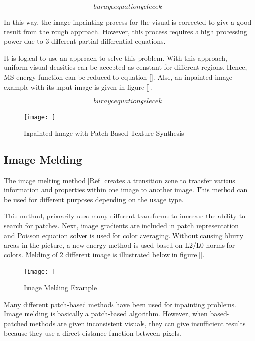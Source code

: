 \begin{equation}
    buraya equation gelecek
\end{equation}

In this way, the image inpainting process for the visual is corrected to give a good result from the rough approach. However, this process requires a high processing power due to 3 different partial differential equations.

It is logical to use an approach to solve this problem. With this approach, uniform visual densities can be accepted as constant for different regions. Hence, MS energy function can be reduced to equation []. Also, an inpainted image example with its input image is given in figure [].

\begin{equation}
    buraya equation gelecek
\end{equation}

\begin{figure}[h]
    \centering
    \texttt{[image: ]}
    \caption{Inpainted Image with Patch Based Texture Synthesis}
    \label{fig:my_label}
\end{figure}

\subsection{Image Melding}

The image melting method [Ref] creates a transition zone to transfer various information and properties within one image to another image. This method can be used for different purposes depending on the usage type.

This method, primarily uses many different transforms to increase the ability to search for patches. Next, image gradients are included in patch representation and Poisson equation solver is used for color averaging. Without causing blurry areas in the picture, a new energy method is used based on L2/L0 norms for colors. Melding of 2 different image is illustrated below in figure [].

\begin{figure}[h]
    \centering
    \texttt{[image: ]}
    \caption{Image Melding Example}
    \label{fig:my_label}
\end{figure}

Many different patch-based methods have been used for inpainting problems. Image melding is basically a patch-based algorithm. However, when based-patched methods are given inconsistent visuals, they can give insufficient results because they use a direct distance function between pixels.

